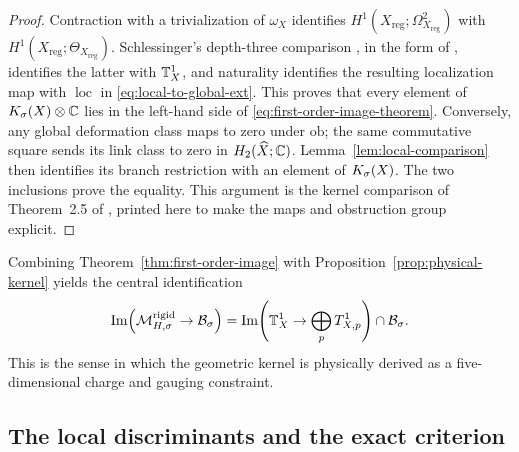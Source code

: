 \begin{proof}
Contraction with a trivialization of $\omega_X$ identifies
$H^1(X_{\mathrm{reg}};\Omega^2_{X_{\mathrm{reg}}})$ with
$H^1(X_{\mathrm{reg}};\Theta_{X_{\mathrm{reg}}})$. Schlessinger's
depth-three comparison \cite{Schlessinger:1971}, in the form of
\cite{Friedman:2022}, identifies the latter with $\mathbb T^1_X$, and
naturality identifies
the resulting localization map with $\operatorname{loc}$ in
\eqref{eq:local-to-global-ext}. This proves that every element of
$K_{\sigma}(X)\otimes\mathbb C$ lies in the left-hand side of
\eqref{eq:first-order-image-theorem}. Conversely, any global deformation
class maps to zero under $\mathrm{ob}$; the same commutative square sends its
link class to zero in $H_2(\widehat X;\mathbb C)$. Lemma~\ref{lem:local-comparison}
then identifies its branch restriction with an element of $K_{\sigma}(X)$. The
two inclusions prove the equality. This argument is the kernel comparison of
Theorem~2.5 of \cite{Wuebben:2026smoothing},
printed here to make the maps and obstruction group explicit.
\end{proof}

Combining Theorem~\ref{thm:first-order-image} with
Proposition~\ref{prop:physical-kernel} yields the central identification
\begin{equation}
 \operatorname{Im}\!\left(
 \mathcal M_{H,\sigma}^{\mathrm{rigid}}\to\mathcal B_{\sigma}
 \right)
 =\operatorname{Im}\!\left(
 \mathbb T^1_X\to\bigoplus_pT^1_{X,p}
 \right)\cap\mathcal B_{\sigma}.
 \label{eq:physical-geometric-identification}
\end{equation}
This is the sense in which the geometric kernel is physically derived as a
five-dimensional charge and gauging constraint.

\subsection{The local discriminants and the exact criterion}
\label{subsec:all-orders}

